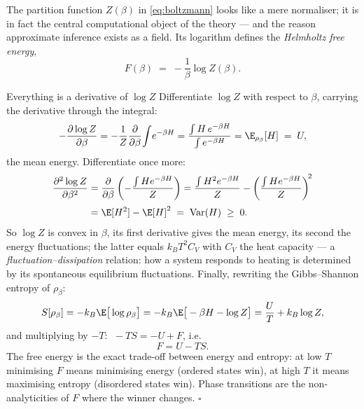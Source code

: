 The partition function $Z(\beta)$ in \eqref{eq:boltzmann} looks like a mere
normaliser; it is in fact the central computational object of the theory ---
and the reason approximate inference exists as a field. Its logarithm defines
the \emph{Helmholtz free energy},
\begin{equation}
  F(\beta) \;=\; -\frac{1}{\beta} \log Z(\beta).
  \label{eq:free-energy}
\end{equation}

\begin{toolbox}{Everything is a derivative of $\log Z$}
Differentiate $\log Z$ with respect to $\beta$, carrying the derivative
through the integral:
\begin{equation*}
  -\frac{\partial \log Z}{\partial \beta}
  = -\frac{1}{Z}\frac{\partial}{\partial \beta}\!\int\! e^{-\beta H}
  = \frac{\int H\, e^{-\beta H}}{\int e^{-\beta H}}
  = \E_{\rho_\beta}[H] \;=\; U ,
\end{equation*}
the mean energy. Differentiate once more:
\begin{align*}
  \frac{\partial^2 \log Z}{\partial \beta^2}
  &= \frac{\partial}{\partial \beta}
     \left( -\frac{\int H e^{-\beta H}}{Z} \right)
   = \frac{\int H^2 e^{-\beta H}}{Z}
     - \left( \frac{\int H e^{-\beta H}}{Z} \right)^{\!2} \\[2pt]
  &= \E[H^2] - \E[H]^2 \;=\; \operatorname{Var}(H) \;\geq\; 0 .
\end{align*}
So $\log Z$ is convex in $\beta$, its first derivative gives the mean energy,
its second the energy fluctuations; the latter equals $k_B T^2 C_V$ with
$C_V$ the heat capacity --- a \emph{fluctuation--dissipation} relation: how a
system responds to heating is determined by its spontaneous equilibrium
fluctuations. Finally, rewriting the Gibbs--Shannon entropy of $\rho_\beta$:
\begin{equation*}
  S[\rho_\beta]
  = -k_B \E\big[\log \rho_\beta\big]
  = -k_B \E\big[-\beta H - \log Z\big]
  = \frac{U}{T} + k_B \log Z ,
\end{equation*}
and multiplying by $-T$: $\; -TS = -U + F$, i.e.
\begin{equation*}
  F = U - TS .
\end{equation*}
The free energy is the exact trade-off between energy and entropy: at low $T$
minimising $F$ means minimising energy (ordered states win), at high $T$ it
means maximising entropy (disordered states win). Phase transitions are the
non-analyticities of $F$ where the winner changes. \hfill$\square$
\end{toolbox}

